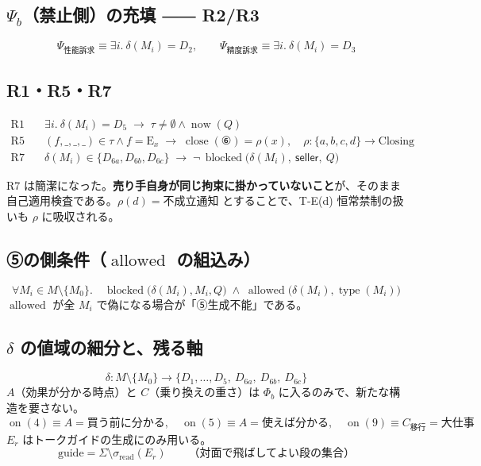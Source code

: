 \documentclass[11pt,a4paper]{article}
\newcommand{\blocked}{\operatorname{blocked}}
\newcommand{\allowed}{\operatorname{allowed}}
\newcommand{\now}{\operatorname{now}}
\newcommand{\on}{\operatorname{on}}
\newcommand{\type}{\operatorname{type}}
\newcommand{\close}{\operatorname{close}}
\newcommand{\seller}{\mathsf{seller}}
\begin{document}
\subsection{$\Psi_b$（禁止側）の充填 ―― R2/R3}
\[
\Psi_{\text{性能訴求}} \equiv \exists i.\ \delta(M_i) = D_2,
\qquad
\Psi_{\text{精度訴求}} \equiv \exists i.\ \delta(M_i) = D_3
\]

\subsection{R1・R5・R7}
\begin{align}
\text{R1}\quad & \exists i.\ \delta(M_i) = D_5 \;\longrightarrow\; \tau \neq \emptyset \wedge \now(Q) \\
\text{R5}\quad & (f,\_,\_,\_) \in \tau \wedge f = \mathrm{E}_x \;\longrightarrow\; \close(⑥) = \rho(x),
\quad \rho: \{a,b,c,d\} \to \text{Closing} \\
\text{R7}\quad & \delta(M_i) \in \{D_{6a},D_{6b},D_{6c}\} \;\longrightarrow\; \neg\,\blocked\bigl(\delta(M_i),\ \seller,\ Q\bigr)
\end{align}

R7 は簡潔になった。\textbf{売り手自身が同じ拘束に掛かっていないこと}が、そのまま自己適用検査である。$\rho(d) = \text{不成立通知}$ とすることで、T-E(d) 恒常禁制の扱いも $\rho$ に吸収される。

\subsection{⑤の側条件（$\allowed$ の組込み）}
\begin{equation}
\forall M_i \in M \setminus \{M_0\}.\quad
\blocked\bigl(\delta(M_i), M_i, Q\bigr) \;\wedge\; \allowed\bigl(\delta(M_i), \type(M_i)\bigr)
\end{equation}
$\allowed$ が全 $M_i$ で偽になる場合が「⑤生成不能」である。

\subsection{$\delta$ の値域の細分と、残る軸}
\[
\delta : M\setminus\{M_0\} \to \{D_1,\dots,D_5,\ D_{6a},\ D_{6b},\ D_{6c}\}
\]
$A$（効果が分かる時点）と $C$（乗り換えの重さ）は $\Phi_b$ に入るのみで、新たな構造を要さない。
\[
\on(4) \equiv A = \text{買う前に分かる},\quad
\on(5) \equiv A = \text{使えば分かる},\quad
\on(9) \equiv C_{\text{移行}} = \text{大仕事}
\]
$E_r$ はトークガイドの生成にのみ用いる。
\[
\mathrm{guide} = \Sigma \setminus \sigma_{\mathrm{read}}(E_r)
\qquad\text{（対面で飛ばしてよい段の集合）}
\]
\end{document}
